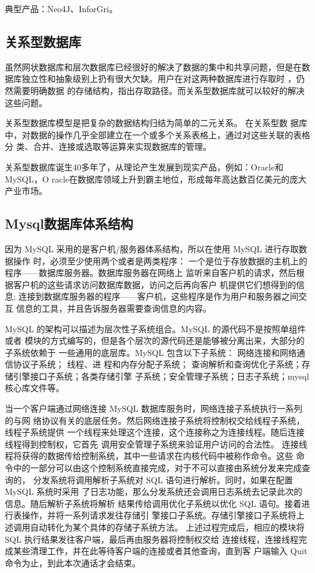 典型产品：Neo4J、InforGri。
\subsection{关系型数据库}
虽然网状数据库和层次数据库已经很好的解决了数据的集中和共享问题，但是在数
据库独立性和抽象级别上扔有很大欠缺。用户在对这两种数据库进行存取时
，仍然需要明确数据
的存储结构，指出存取路径。而关系型数据库就可以较好的解决这些问题。

关系型数据库模型是把复杂的数据结构归结为简单的二元关系。
在关系型数
据库中，对数据的操作几乎全部建立在一个或多个关系表格上，通过对这些关联的表格分
类、合并、连接或选取等运算来实现数据库的管理。

关系型数据库诞生40多年了，从理论产生发展到现实产品，例如：Oracle和MySQL，O
racle在数据库领域上升到霸主地位，形成每年高达数百亿美元的庞大产业市场。
\subsection{Mysql数据库体系结构}
因为 MySQL 采用的是客户机/服务器体系结构，所以在使用 MySQL 进行存取数据操作
时，必须至少使用两个或者是两类程序：
一个是位于存放数据的主机上的程序——数据库服务器。数据库服务器在网络上
监听来自客户机的请求，然后根据客户机的这些请求访问数据库数据，访问之后再向客户
机提供它们想得到的信息;
连接到数据库服务器的程序——客户机，这些程序是作为用户和服务器之间交互
信息的工具，并且告诉服务器需要查询信息的内容。

MySQL 的架构可以描述为层次性子系统组合。MySQL 的源代码不是按照单组件或者
模块的方式编写的，但是各个层次的源代码还是能够被分离出来，大部分的子系统依赖于
一些通用的底层库。MySQL 包含以下子系统：
网络连接和网络通信协议子系统；
线程、进
程和内存分配子系统；
查询解析和查询优化子系统；存储引擎接口子系统；各类存储引擎
子系统；安全管理子系统；日志子系统；mysql核心库文件等。

当一个客户端通过网络连接 MySQL 数据库服务时，网络连接子系统执行一系列的与网
络协议有关的底层任务。然后网络连接子系统将控制权交给线程子系统，线程子系统提供
一个线程来处理这个连接，这个连接称之为连接线程。随后连接线程得到控制权，它首先
调用安全管理子系统来验证用户访问的合法性。
连接线程将获得的数据传给控制系统，其中一些请求在内核代码中被称作命令。这些
命令中的一部分可以由这个控制系统直接完成，对于不可以直接由系统分发来完成查询的，
分发系统将调用解析子系统对 SQL 语句进行解析。同时，如果在配置 MySQL 系统时采用
了日志功能，那么分发系统还会调用日志系统去记录此次的信息。随后解析子系统将解析
结果传给调用优化子系统以优化 SQL 语句。接着进行表操作，并将一系列请求发往存储引
擎接口子系统。存储引擎接口子系统将上述调用自动转化为某个具体的存储子系统方法。
上述过程完成后，相应的模块将 SQL 执行结果发往客户端，最后再由服务器将控制权交给
连接线程，连接线程完成某些清理工作，并在此等待客户端的连接或者其他查询，直到客
户端输入 Quit 命令为止，到此本次通话才会结束。
